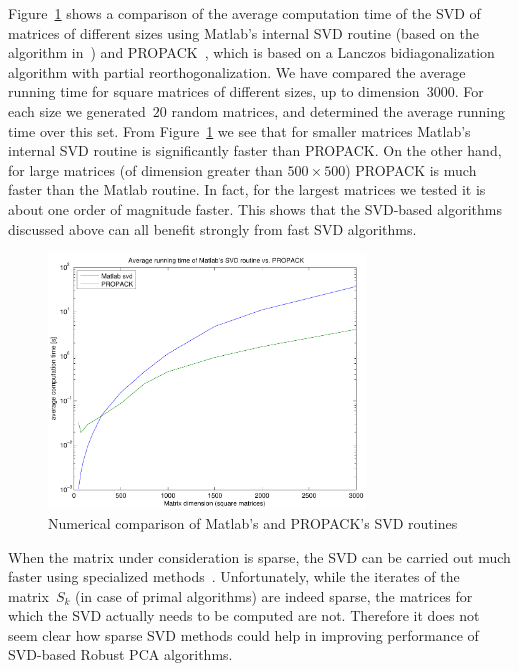 \documentclass{../../common/projectreport}
\begin{document}
Figure~\ref{Algorithms:Discussion:SVD:MatlabVSPropack:figure} shows a comparison of the average computation time of the SVD of matrices of different sizes using Matlab's internal SVD routine (based on the algorithm in~\cite{Demmel:1990vn}) and PROPACK~\cite{Larsen:1998uq}, which is based on a Lanczos bidiagonalization algorithm with partial reorthogonalization. We have compared the average running time for square matrices of different sizes, up to dimension~$3000$. For each size we generated~$20$ random matrices, and determined the average running time over this set. From Figure~\ref{Algorithms:Discussion:SVD:MatlabVSPropack:figure} we see that for smaller matrices Matlab's internal SVD routine is significantly faster than PROPACK. On the other hand, for large matrices (of dimension greater than $500 \times 500$) PROPACK is much faster than the Matlab routine. In fact, for the largest matrices we tested it is about one order of magnitude faster. This shows that the SVD-based algorithms discussed above can all benefit strongly from fast SVD algorithms. 
%
\begin{figure}[htbp]
\centering
\includegraphics[width=0.75\textwidth]{../figures/svd_comparison}
\caption{Numerical comparison of Matlab's and PROPACK's SVD routines}
\label{Algorithms:Discussion:SVD:MatlabVSPropack:figure}
\end{figure}


When the matrix under consideration is sparse, the SVD can be carried out much faster using specialized methods~\cite{Berry:2005uq}. Unfortunately, while the iterates of the matrix~$S_k$ (in case of primal algorithms) are indeed sparse, the matrices for which the SVD actually needs to be computed are not. Therefore it does not seem clear how sparse SVD methods could help in improving performance of SVD-based Robust PCA algorithms. 
\end{document}

